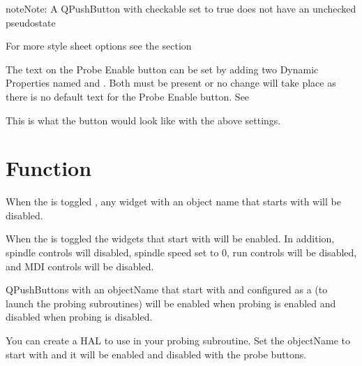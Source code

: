 \documentclass[letterpaper,10pt,english]{sphinxmanual}
\begin{document}
\begin{sphinxadmonition}{note}{Note:}
\sphinxAtStartPar
A QPushButton with checkable set to true does not have an unchecked
pseudo\sphinxhyphen{}state
\end{sphinxadmonition}

\sphinxAtStartPar
For more style sheet options see the {\hyperref[\detokenize{style::doc}]{}} section

\sphinxAtStartPar
The text on the Probe Enable button can be set by adding two Dynamic Properties
named  and . Both must be present or no change will take
place as there is no default text for the Probe Enable button.
See {\hyperref[\detokenize{property::doc}]{}}


\sphinxAtStartPar
This is what the button would look like with the above settings.



\section{Function}
\label{\detokenize{probe:function}}
\sphinxAtStartPar
When the  is toggled , any widget with an object name
that starts with  will be disabled.

\sphinxAtStartPar
When the  is toggled  the widgets that start with
 will be enabled. In addition, spindle controls will disabled, spindle
speed set to 0, run controls will be disabled, and MDI controls will be disabled.

\sphinxAtStartPar
QPushButtons with an objectName that start with  and configured as a
{\hyperref[\detokenize{mdi:mdibuttontag}]{}} (to launch the probing subroutines) will be enabled when
probing is enabled and disabled when probing is disabled.

\sphinxAtStartPar
You can create a HAL {\hyperref[\detokenize{hal:spinboxtag}]{}} to use in your probing subroutine. Set
the objectName to start with  and it will be enabled and disabled with
the probe buttons.
\end{document}
